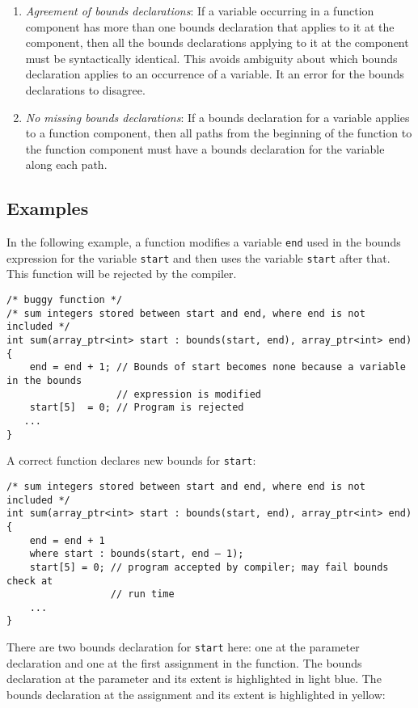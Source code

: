 \begin{enumerate}
\item
  \emph{Agreement of bounds declarations}: If a variable occurring in a
  function component has more than one bounds declaration that applies
  to it at the component, then all the bounds declarations applying to
  it at the component must be syntactically identical. This avoids
  ambiguity about which bounds declaration applies to an occurrence of a
  variable. It an error for the bounds declarations to disagree.
\item
  \emph{No missing bounds declarations}: If a bounds declaration for a
  variable applies to a function component, then all paths from the
  beginning of the function to the function component must have a bounds
  declaration for the variable along each path.
\end{enumerate}

\subsection{Examples}
\label{examples:consistency}

In the following example, a function modifies a variable \texttt{end}
used in the bounds expression for the variable \texttt{start} and then
uses the variable \texttt{start} after that. This function will be
rejected by the compiler.

\begin{verbatim}
/* buggy function */
/* sum integers stored between start and end, where end is not included */
int sum(array_ptr<int> start : bounds(start, end), array_ptr<int> end)
{ 
    end = end + 1; // Bounds of start becomes none because a variable in the bounds
                   // expression is modified
    start[5]  = 0; // Program is rejected
   ...
}
\end{verbatim}

A correct function declares new bounds for \texttt{start}:

\begin{verbatim}
/* sum integers stored between start and end, where end is not included */
int sum(array_ptr<int> start : bounds(start, end), array_ptr<int> end)
{ 
    end = end + 1
    where start : bounds(start, end – 1);
    start[5] = 0; // program accepted by compiler; may fail bounds check at 
                  // run time
    ...
}
\end{verbatim}

There are two bounds declaration for \texttt{start} here: one at the
parameter declaration and one at the first assignment in the function.
The bounds declaration at the parameter and its extent is highlighted in
light blue. The bounds declaration at the assignment and its extent is
highlighted in yellow:

